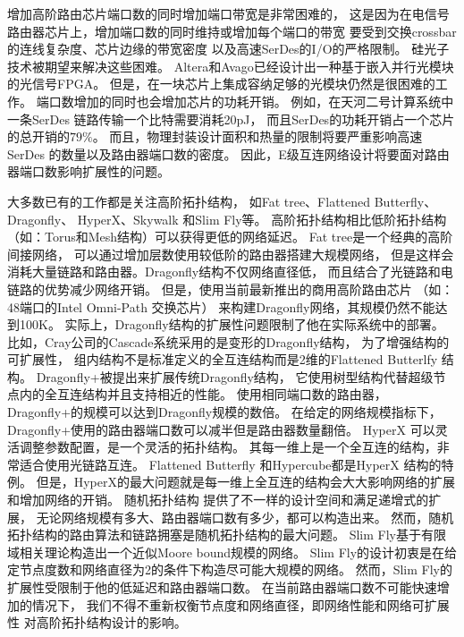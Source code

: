 增加高阶路由芯片端口数的同时增加端口带宽是非常困难的，
这是因为在电信号路由器芯片上，增加端口数的同时维持或增加每个端口的带宽
要受到交换crossbar的连线复杂度、芯片边缘的带宽密度
以及高速SerDes的I/O的严格限制。
硅光子技术被期望来解决这些困难。
Altera和Avago已经设计出一种基于嵌入并行光模块的光信号FPGA。
但是，在一块芯片上集成容纳足够的光模块仍然是很困难的工作。
端口数增加的同时也会增加芯片的功耗开销。
例如，在天河二号计算系统中一条SerDes 链路传输一个比特需要消耗20pJ，
而且SerDes的功耗开销占一个芯片的总开销的$79\%$。
而且，物理封装设计面积和热量的限制将要严重影响高速SerDes
的数量以及路由器端口数的密度。
因此，E级互连网络设计将要面对路由器端口数影响扩展性的问题。

大多数已有的工作都是关注高阶拓扑结构，
如Fat tree、Flattened Butterfly、Dragonfly、
HyperX、Skywalk 和Slim Fly等。
高阶拓扑结构相比低阶拓扑结构（如：Torus和Mesh结构）可以获得更低的网络延迟。
Fat tree是一个经典的高阶间接网络，
可以通过增加层数使用较低阶的路由器搭建大规模网络，
但是这样会消耗大量链路和路由器。Dragonfly结构不仅网络直径低，
而且结合了光链路和电链路的优势减少网络开销。
但是，使用当前最新推出的商用高阶路由芯片
（如：48端口的Intel Omni-Path 交换芯片）
来构建Dragonfly网络，其规模仍然不能达到100K。
实际上，Dragonfly结构的扩展性问题限制了他在实际系统中的部署。
比如，Cray公司的Cascade系统采用的是变形的Dragonfly结构，
为了增强结构的可扩展性，
组内结构不是标准定义的全互连结构而是2维的Flattened Butterlfy 结构。
Dragonfly+被提出来扩展传统Dragonfly结构，
它使用树型结构代替超级节点内的全互连结构并且支持相近的性能。
使用相同端口数的路由器，Dragonfly+的规模可以达到Dragonfly规模的数倍。
在给定的网络规模指标下，Dragonfly+使用的路由器端口数可以减半但是路由器数量翻倍。
HyperX 可以灵活调整参数配置，是一个灵活的拓扑结构。
其每一维上是一个全互连的结构，非常适合使用光链路互连。
Flattened Butterfly 和Hypercube都是HyperX 结构的特例。
但是，HyperX的最大问题就是每一维上全互连的结构会大大影响网络的扩展和增加网络的开销。
随机拓扑结构
提供了不一样的设计空间和满足递增式的扩展，
无论网络规模有多大、路由器端口数有多少，都可以构造出来。
然而，随机拓扑结构的路由算法和链路拥塞是随机拓扑结构的最大问题。
Slim Fly基于有限域相关理论构造出一个近似Moore bound规模的网络。
Slim Fly的设计初衷是在给定节点度数和网络直径为2的条件下构造尽可能大规模的网络。
然而，Slim Fly的扩展性受限制于他的低延迟和路由器端口数。
在当前路由器端口数不可能快速增加的情况下，
我们不得不重新权衡节点度和网络直径，即网络性能和网络可扩展性
对高阶拓扑结构设计的影响。

